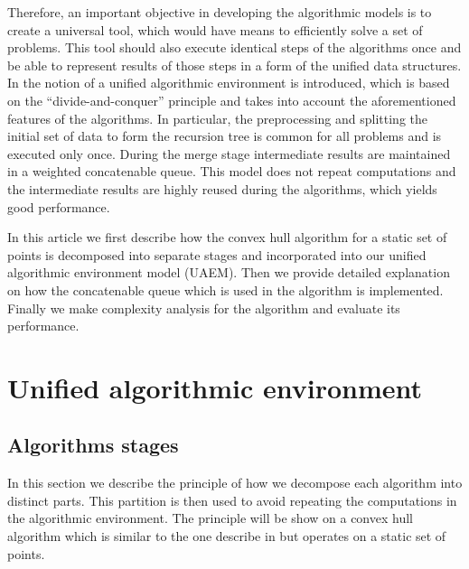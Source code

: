 \documentclass[a4paper,english,numberwithinsect,notab]{eurocg20-submission}
\begin{document}
	Therefore, an important objective in developing the algorithmic models is to create a universal tool, which would have means to efficiently solve a set of problems. This tool should also execute identical steps of the algorithms once and be able to represent results of those steps in a form of the unified data structures. In \cite{tereshchenko} the notion of a unified algorithmic environment is introduced, which is based on the ``divide-and-conquer'' principle and takes into account the aforementioned features of the algorithms. In particular, the preprocessing and splitting the initial set of data to form the recursion tree is common for all problems and is executed only once. During the merge stage intermediate results are maintained in a weighted concatenable queue. This model does not repeat computations and the intermediate results are highly reused during the algorithms, which yields good performance.
	
	In this article we first describe how the convex hull algorithm for a static set of points is decomposed into separate stages and incorporated into our unified algorithmic environment model (UAEM). Then we provide detailed explanation on how the concatenable queue which is used in the algorithm is implemented. Finally we make complexity analysis for the algorithm and evaluate its performance.


\section{Unified algorithmic environment}
\label{sec:unified-algorithmic-environment}
\subsection{Algorithms stages}


	
	
	In this section we describe the principle of how we decompose each algorithm into distinct parts. This partition is then used to avoid repeating the computations in the algorithmic environment. The principle will be show on a convex hull algorithm which is similar to the one describe in \cite{overmars} but operates on a static set of points.
	
\end{document}
